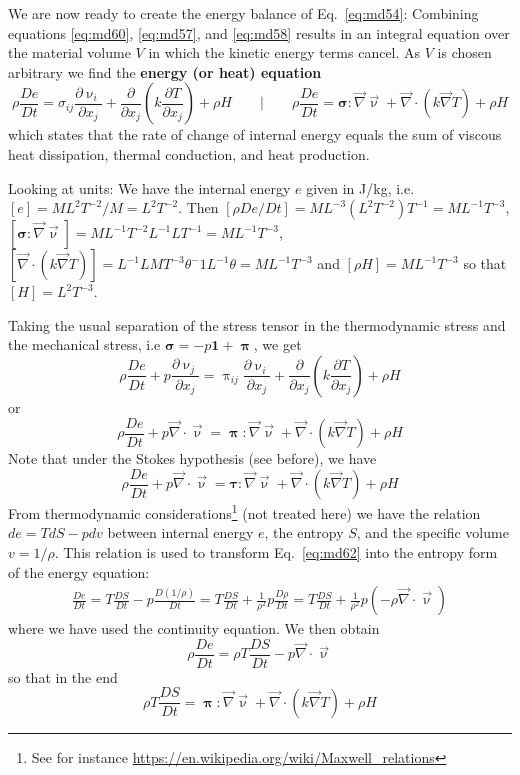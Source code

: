 We are now ready to create the energy balance of Eq.~\eqref{eq:md54}:
Combining equations \eqref{eq:md60}, \eqref{eq:md57}, and
\eqref{eq:md58} results in an integral equation over the material volume $V$ in which the kinetic
energy terms cancel. As $V$ is chosen arbitrary we find the {\bf energy (or heat) equation}
\begin{equation}
\rho \frac{De}{Dt} = \sigma_{ij} \frac{\partial \upnu_i}{\partial x_j} + 
\frac{\partial }{\partial x_j} \left(k \frac{\partial T}{\partial x_j}\right) 
+ \rho H
\qquad
\bigg\rvert
\qquad
\rho \frac{De}{Dt} = {\bm \sigma}: \vec\nabla \vec\upnu
+\vec\nabla \cdot (k \vec\nabla T) + \rho H
\label{eq:md61}
\end{equation}
which states that the rate of change of internal energy equals the sum of viscous heat
dissipation, thermal conduction, and heat production.

\begin{remark}
Looking at units:
We have the internal energy $e$ given in J/kg, i.e. $[e]=ML^2T^{-2}/M=L^2T^{-2}$.
Then $[\rho De/Dt]= ML^{-3}(L^2T^{-2})T^{-1} = M L^{-1} T^{-3}$,
$[{\bm \sigma}: \vec\nabla \vec\upnu] = ML^{-1}T^{-2}  L^{-1} LT^{-1}=ML^{-1} T^{-3}$,
$[\vec\nabla \cdot (k \vec\nabla T)]=L^{-1} L M T^{-3} \theta^-1 L^{-1} \theta
= M L^{-1} T^{-3}$ and $[\rho H]= M L^{-1} T^{-3} $ so that $[H]=  L^{2} T^{-3}$.
\end{remark}

Taking the usual separation of the stress tensor in the thermodynamic stress and the
mechanical stress, i.e ${\bm \sigma} = -p {\bm 1} + {\bm \uppi}$, we get
\begin{equation}
\rho \frac{De}{Dt} + p \frac{\partial \upnu_j}{\partial x_j} 
= \uppi_{ij} \frac{\partial \upnu_i}{\partial x_j} + 
\frac{\partial }{\partial x_j} (k \frac{\partial T}{\partial x_j}) + \rho H
\label{eq:md62}
\end{equation}
or
\[
\rho \frac{De}{Dt} + p \vec\nabla \cdot \vec\upnu 
= {\bm \uppi} : \vec\nabla\vec\upnu  
+\vec\nabla \cdot (k \vec\nabla T) + \rho H
\]
Note that under the Stokes hypothesis (see before), we have
\[
\rho \frac{De}{Dt} + p \vec\nabla \cdot \vec\upnu 
= {\bm \tau} : \vec\nabla\vec\upnu  
+\vec\nabla \cdot (k \vec\nabla T) + \rho H
\]
From thermodynamic considerations\footnote{See for 
instance \url{https://en.wikipedia.org/wiki/Maxwell_relations}} 
(not treated here) we have the relation
$de=TdS-p dv$ between internal energy $e$, the entropy $S$, 
and the specific volume $v=1/\rho$. 
This relation is used to transform Eq.~\eqref{eq:md62} into 
the entropy form of the energy equation:
\begin{eqnarray}
\frac{De}{Dt} 
= T \frac{DS}{Dt} - p \frac{D(1/\rho)}{Dt} 
= T \frac{DS}{Dt} + \frac{1}{\rho^2} p \frac{D \rho}{Dt} 
= T \frac{DS}{Dt} + \frac{1}{\rho^2} p (-\rho \vec\nabla\cdot \vec\upnu) 
\end{eqnarray}
where we have used the continuity equation. We then obtain
\[
\rho \frac{De}{Dt} 
=
\rho T \frac{DS}{Dt} -  p \vec\nabla\cdot \vec\upnu 
\]
so that in the end
\begin{equation}
\rho T \frac{DS}{Dt} = 
{\bm \uppi}: \vec\nabla\vec\upnu + 
\vec\nabla \cdot (k \vec\nabla T) + \rho H
\label{eq:md63}
\end{equation}

